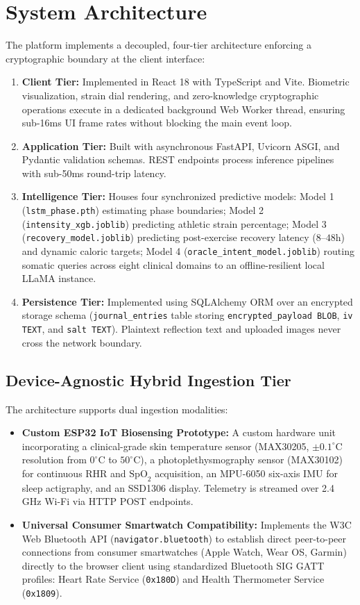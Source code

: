 \documentclass[conference]{IEEEtran}
\begin{document}
\section{System Architecture}
The platform implements a decoupled, four-tier architecture enforcing a cryptographic boundary at the client interface:
\begin{enumerate}
    \item \textbf{Client Tier:} Implemented in React 18 with TypeScript and Vite. Biometric visualization, strain dial rendering, and zero-knowledge cryptographic operations execute in a dedicated background Web Worker thread, ensuring sub-16ms UI frame rates without blocking the main event loop.
    \item \textbf{Application Tier:} Built with asynchronous FastAPI, Uvicorn ASGI, and Pydantic validation schemas. REST endpoints process inference pipelines with sub-50ms round-trip latency.
    \item \textbf{Intelligence Tier:} Houses four synchronized predictive models: Model 1 (\texttt{lstm\_phase.pth}) estimating phase boundaries; Model 2 (\texttt{intensity\_xgb.joblib}) predicting athletic strain percentage; Model 3 (\texttt{recovery\_model.joblib}) predicting post-exercise recovery latency ($8$--$48$h) and dynamic caloric targets; Model 4 (\texttt{oracle\_intent\_model.joblib}) routing somatic queries across eight clinical domains to an offline-resilient local LLaMA instance.
    \item \textbf{Persistence Tier:} Implemented using SQLAlchemy ORM over an encrypted storage schema (\texttt{journal\_entries} table storing \texttt{encrypted\_payload BLOB}, \texttt{iv TEXT}, and \texttt{salt TEXT}). Plaintext reflection text and uploaded images never cross the network boundary.
\end{enumerate}

\subsection{Device-Agnostic Hybrid Ingestion Tier}
The architecture supports dual ingestion modalities:
\begin{itemize}
    \item \textbf{Custom ESP32 IoT Biosensing Prototype:} A custom hardware unit incorporating a clinical-grade skin temperature sensor (MAX30205, $\pm 0.1^\circ$C resolution from $0^\circ$C to $50^\circ$C), a photoplethysmography sensor (MAX30102) for continuous RHR and $\text{SpO}_2$ acquisition, an MPU-6050 six-axis IMU for sleep actigraphy, and an SSD1306 display. Telemetry is streamed over 2.4 GHz Wi-Fi via HTTP POST endpoints.
    \item \textbf{Universal Consumer Smartwatch Compatibility:} Implements the W3C Web Bluetooth API (\texttt{navigator.bluetooth}) to establish direct peer-to-peer connections from consumer smartwatches (Apple Watch, Wear OS, Garmin) directly to the browser client using standardized Bluetooth SIG GATT profiles: Heart Rate Service (\texttt{0x180D}) and Health Thermometer Service (\texttt{0x1809}).
\end{itemize}
\end{document}
